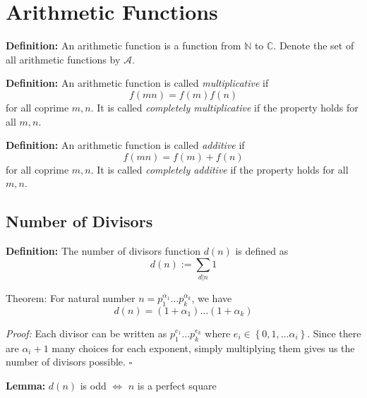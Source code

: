 \documentclass[a4paper,11pt,abstracton]{scrartcl}
\theoremstyle{dotlessP}
\theoremstyle{dotlessS}
\theoremstyle{remark}
\theoremstyle{definition}
\begin{document}
\section{Arithmetic Functions}

\begin{definition_box}
\textbf{Definition:} An arithmetic function is a function from $\mathbb{N}$ to $\mathbb{C}$. Denote the set of all arithmetic functions by $\mathcal{A}$.
\end{definition_box}

\begin{definition_box}
\textbf{Definition:} An arithmetic function is called \emph{multiplicative} if $$f(mn)=f(m)f(n)$$ for all coprime $m,n$. It is called \emph{completely multiplicative} if the property holds for all $m,n$.
\end{definition_box}

\begin{definition_box}
\textbf{Definition:} An arithmetic function is called \emph{additive} if $$f(mn)=f(m)+f(n)$$ for all coprime $m,n$. It is called \emph{completely additive} if the property holds for all $m,n$.
\end{definition_box}

\subsection{Number of Divisors}

\begin{definition_box}
\textbf{Definition:} The number of divisors function $d(n)$ is defined as 
$$d(n):= \sum_{d|n}1 $$
\end{definition_box}

\begin{mainbox}{Theorem:}
For natural number $n=p_1^{\alpha_1} \dots p_k^{\alpha_k}$, we have 
$$d(n)=(1+\alpha_1) \dots (1+\alpha_k)$$
\end{mainbox}

\begin{claim_box}
\textit{Proof:}
Each divisor can be written as $p_1^{e_1} \dots p_k^{e_k}$
where $e_i \in \left\{ 0,1, \dots \alpha_i \right\}$.
Since there are $\alpha_i + 1$ many choices for each exponent, simply multiplying them gives us the number of divisors possible.
\hfill$\square$
\end{claim_box}

\begin{claim_box}
\textbf{Lemma:}
$d(n)$ is odd $\iff$ $n$ is a perfect square
\end{claim_box}
\end{document}
